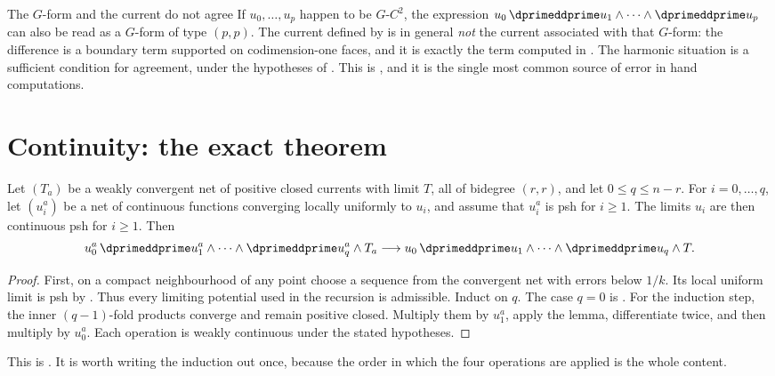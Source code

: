 \begin{warning}{The $G$-form and the current do not agree}
If $u_0,\ldots,u_p$ happen to be $G$-$C^2$, the expression
$u_0\,\dprimeddprime u_1\wedge\cdots\wedge\dprimeddprime u_p$ can also be
read as a $G$-form of type $(p,p)$.  The current defined by
 is in general \emph{not} the current associated
with that $G$-form: the difference is a boundary term supported on
codimension-one faces, and it is exactly the term computed in
.  The harmonic situation is a sufficient condition for agreement,
under the hypotheses of .  This is
\cite[Remark~8.8.7]{CLD25}, and it is the single most common source of
error in hand computations.
\end{warning}

\section{Continuity: the exact theorem}
\label{sec:ch16-continuity}

\begin{theorem}
\label{thm:cld-bt-continuity}
Let $(T_a)$ be a weakly convergent net of positive closed currents with limit
$T$, all of bidegree $(r,r)$, and let $0\leq q\leq n-r$.
For $i=0,\ldots,q$, let $(u_i^a)$ be a net of continuous functions
converging locally uniformly to $u_i$, and assume that $u_i^a$ is psh for
$i\geq1$.  The limits $u_i$ are then continuous psh for $i\geq1$.
Then
\[
 u_0^a\,\dprimeddprime u_1^a\wedge\cdots\wedge
 \dprimeddprime u_q^a\wedge T_a
 \longrightarrow
 u_0\,\dprimeddprime u_1\wedge\cdots\wedge
 \dprimeddprime u_q\wedge T.
\]
\end{theorem}
\begin{proof}
First, on a compact neighbourhood of any point choose a sequence
from the convergent net with errors below $1/k$.  Its local uniform limit
is psh by .  Thus every limiting potential
used in the recursion is admissible.  Induct on $q$.  The case $q=0$ is
.  For the induction step,
the inner $(q-1)$-fold products converge and remain positive closed.  Multiply
them by $u_1^a$, apply the lemma, differentiate twice, and then multiply by
$u_0^a$.  Each operation is weakly continuous under the stated hypotheses.
\end{proof}

This is \cite[Proposition~8.7.2]{CLD25}.  It is worth writing the induction
out once, because the order in which the four operations are applied is the
whole content.


